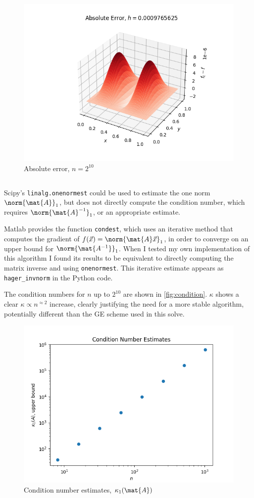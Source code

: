 \documentclass{template}
\begin{document}
\begin{figure}[h]
    \centering
    \includegraphics[width=0.65\linewidth]{abs_errs.png}
    \caption{Absolute error, $n=2^{10}$}
    \label{fig:numerical_error}
\end{figure}




\subsection{} 

Scipy's \verb|linalg.onenormest| could be used to estimate the one norm $\norm{\mat{A}}_1$, but does not directly compute the condition number, which requires $\norm{\mat{A}^{-1}}_1$, or an appropriate estimate.

Matlab provides the function \verb|condest|, which uses an iterative method \cite{hager1984condition} that computes the gradient of $f(\vec{x}) = \norm{\mat{A}\vec{x}}_1$, in order to converge on an upper bound for $\norm{\mat{A^{-1}}}_1$. When I tested my own implementation of this algorithm I found its results to be equivalent to directly computing the matrix inverse and using \verb|onenormest|. This iterative estimate appears as \verb|hager_invnorm| in the Python code.

The condition numbers for $n$ up to $2^{10}$ are shown in \autoref{fig:condition}. $\kappa$ shows a clear $\kappa \propto n^{\approx 2}$ increase, clearly justifying the need for a more stable algorithm, potentially different than the GE scheme used in this solve.

\begin{figure}[h]
    \centering
    \includegraphics[width=0.65\linewidth]{condition_log.png}
    \caption{Condition number estimates, $\kappa_1(\mat{A})$}
    \label{fig:condition}
\end{figure}
\end{document}
